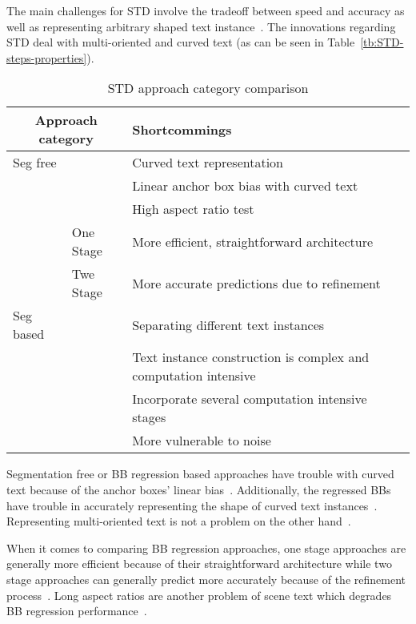 The main challenges for \ac{STD} involve the tradeoff between speed and accuracy as well as
representing arbitrary shaped text instance~\citep{wang_efficient_2019}.
The innovations regarding \ac{STD} deal with multi-oriented and curved text (as can be seen in
Table~\ref{tb:STD-steps-properties}).
\begin{table}[h]
    \centering\scriptsize
    \begin{tabular}{p{}p{}p{}}
        \multicolumn{2}{c}{\textbf{Approach category}} & \textbf{Shortcommings} \\
        \toprule
        Seg free & & Curved text representation~\citep{long_scene_2021,wang_shape_2019} \\
        & & Linear anchor box bias with curved text~\citep{wang_shape_2019,ferrari_textsnake_2018} \\
        & & High aspect ratio test~\citep{shi_detecting_2017,long_scene_2021} \\
        & One Stage & More efficient, straightforward architecture~\citep{lu_mimicdet_2020} \\
        & Twe Stage & More accurate predictions due to refinement~\citep{lu_mimicdet_2020} \\
        \midrule
        Seg based & & Separating different text instances~\citep{wang_shape_2019} \\
        & & Text instance construction is complex and computation
            intensive~\citep{xie_aggregation_2019,liao_real-time_2019,qiao_text_2021} \\
        & & Incorporate several computation intensive stages~\citep{dai_fused_2018} \\
        & & More vulnerable to noise~\citep{long_scene_2021} \\
        \bottomrule
    \end{tabular}
    \caption{STD approach category comparison\label{tb:STD-comparison}}
\end{table}
Segmentation free or \ac{BB} regression based approaches have trouble with curved text because of
the anchor boxes' linear bias~\citep{wang_shape_2019,ferrari_textsnake_2018}.
Additionally, the regressed \acp{BB} have trouble in accurately representing the shape of curved
text instances~\citep{long_scene_2021,wang_shape_2019}.
Representing multi-oriented text is not a problem on the other
hand~\citep{liao_textboxes_2018,jiang_r2cnn_2017}.

When it comes to comparing \ac{BB} regression approaches, one stage approaches are generally more
efficient  because of their straightforward architecture while two stage approaches can generally
predict more accurately  because of the refinement process~\citep{lu_mimicdet_2020}.
Long aspect ratios are another problem of scene text which degrades \ac{BB} regression
performance~\citep{shi_detecting_2017,long_scene_2021}.

